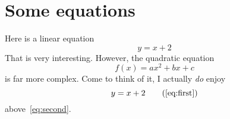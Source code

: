 \documentclass{scrbook}
\begin{document}
\section{Some equations}

Here is a linear equation
\begin{equation}
	y=x+2 \label{eq:first}
\end{equation}
That is very interesting. However, the quadratic equation
\begin{equation}
	f(x)=ax^2+bx+c \label{eq:second}
\end{equation}
is far more complex. Come to think of it, I actually \emph{do\/} enjoy
\begin{equation*}
	y=x+2 \tag{\ref{eq:first}}
\end{equation*}
above~\eqref{eq:second}.
\end{document}
